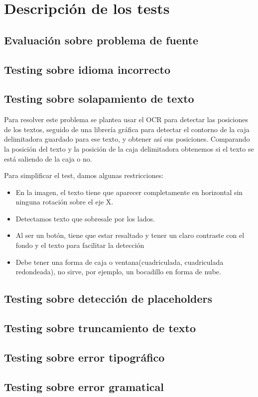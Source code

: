 \section{Descripción de los tests}




\subsection{Evaluación sobre problema de fuente }


\subsection{Testing sobre idioma incorrecto}


\subsection{Testing sobre solapamiento de texto }
Para resolver este problema se plantea usar el OCR para detectar las posiciones de los textos, seguido de una librería gráfica para detectar el contorno de la caja delimitadora guardado para ese texto, y obtener así sus posiciones. Comparando la posición del texto y la posición de la caja delimitadora obtenemos si el texto se está saliendo de la caja o no.
	
Para simplificar el test, damos algunas restricciones: 
\begin{itemize}
	\item En la imagen, el texto tiene que aparecer completamente en horizontal sin ninguna rotación sobre el eje X.
	\item Detectamos texto que sobresale por los lados.
	\item Al ser un botón, tiene que estar resaltado y tener un claro contraste con el fondo y el texto para facilitar la detección
	\item Debe tener una forma de caja o ventana(cuadriculada, cuadriculada redondeada), no sirve, por ejemplo, un bocadillo en forma de nube.
\end{itemize} 
	
\subsection{Testing sobre detección de placeholders}


\subsection{Testing sobre truncamiento de texto}


\subsection{Testing sobre error tipográfico}


\subsection{Testing sobre error gramatical}

 

